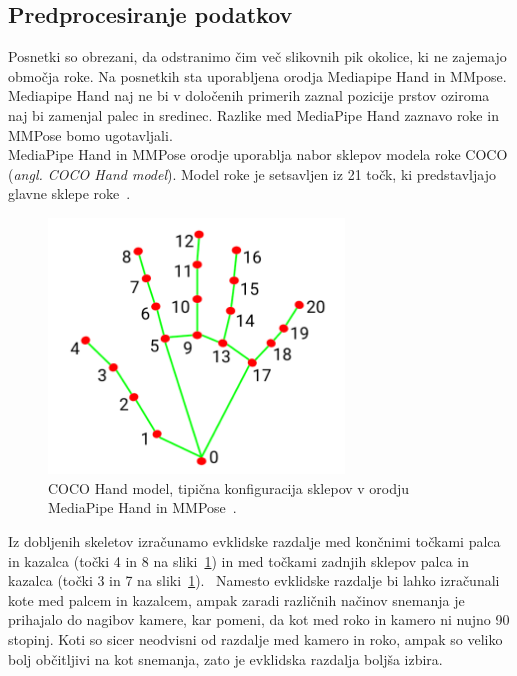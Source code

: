 \documentclass[a4paper,12pt]{article}
\begin{document}
\subsection{Predprocesiranje podatkov}

Posnetki so obrezani, da odstranimo čim več slikovnih pik okolice, ki ne zajemajo območja roke. Na posnetkih 
sta uporabljena orodja Mediapipe Hand in MMpose. Mediapipe Hand naj ne bi v določenih primerih zaznal pozicije prstov 
oziroma naj bi zamenjal palec in sredinec. Razlike med MediaPipe Hand zaznavo roke in MMPose bomo ugotavljali. \\

MediaPipe Hand in MMPose orodje uporablja nabor sklepov modela roke COCO (\textit{angl. COCO Hand model}). Model roke 
je setsavljen iz 21 točk, ki predstavljajo glavne sklepe roke~\cite{Li1}. \\

\begin{figure}[H]
  \centering
  \includegraphics[width=0.7\textwidth]{slike/coco_hand.png}  
  \caption{COCO Hand model, tipična konfiguracija sklepov v orodju MediaPipe Hand in MMPose~\cite{Li1}.}
  \label{fig:coco_hand}
\end{figure}

Iz dobljenih skeletov izračunamo evklidske razdalje med končnimi točkami palca in kazalca (točki 4 in 8 na 
sliki~\ref{fig:coco_hand}) in 
med točkami zadnjih sklepov palca in kazalca (točki 3 in 7 na sliki~\ref{fig:coco_hand}). \
Namesto evklidske razdalje bi lahko izračunali kote med palcem in kazalcem, ampak zaradi različnih 
načinov snemanja je prihajalo do nagibov kamere, kar pomeni, da kot med roko in kamero ni nujno 90 stopinj. 
Koti so sicer neodvisni od razdalje med kamero in roko, ampak so veliko bolj občitljivi na kot snemanja, 
zato je evklidska razdalja boljša izbira. \\
\end{document}
